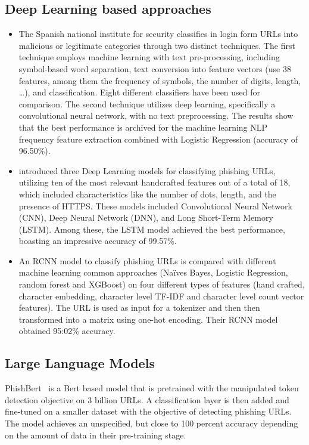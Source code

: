 \documentclass{article}
\begin{document}
    \subsection{Deep Learning based approaches}\label{subsec:deep-learning-based-approaches}

    \begin{itemize}
        \item  The Spanish national institute for security classifies in\cite{PhishingLoginURLDetection} login form URLs into malicious or legitimate categories through two distinct techniques.
        The first technique employs machine learning with text pre-processing, including symbol-based word separation, text conversion into feature vectors (use 38 features, among them the frequency of symbols, the number of digits, length, \ldots), and classification.
        Eight different classifiers have been used for comparison.
        The second technique utilizes deep learning, specifically a convolutional neural network, with no text preprocessing.
        The results show that the best performance is archived for the machine learning NLP frequency feature extraction combined with Logistic Regression (accuracy of 96.50\%).


        \item \cite{EfficientDeepLearningPhishingDetection} introduced three Deep Learning models for classifying phishing URLs, utilizing ten of the most relevant handcrafted features out of a total of 18, which included characteristics like the number of dots, length, and the presence of HTTPS. These models included Convolutional Neural Network (CNN), Deep Neural Network (DNN), and Long Short-Term Memory (LSTM). Among these, the LSTM model achieved the best performance, boasting an impressive accuracy of 99.57\%.

        \item An RCNN model to classify phishing URLs is compared with different machine learning common approaches (Naïves Bayes, Logistic Regression, random forest and XGBoost) on four different types of features (hand crafted, character embedding, character level TF-IDF and character level count vector features)\cite{CharacterLevelCNN}.
        The URL is used as input for a tokenizer and then then transformed into a matrix using one-hot encoding.
        Their RCNN model obtained 95:02\% accuracy.

    \end{itemize}

    \subsection{Large Language Models}\label{subsec:large-language-models}
    PhishBert~\cite{PhishBert} is a Bert based model that is pretrained with the manipulated token detection objective on 3 billion URLs.
    A classification layer is then added and fine-tuned on a smaller dataset with the objective of detecting phishing URLs.
    The model achieves an unspecified, but close to 100 percent accuracy depending on the amount of data in their pre-training stage.
\end{document}
